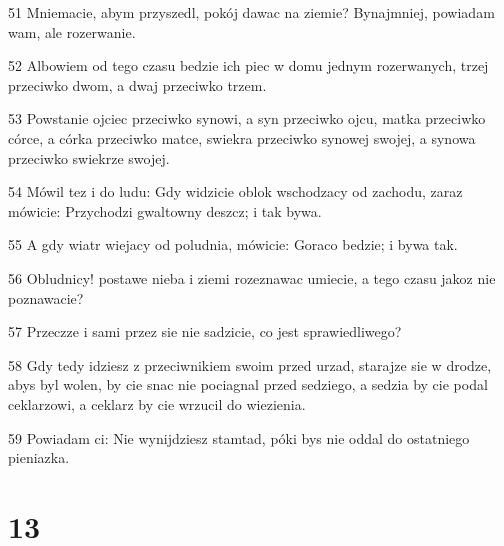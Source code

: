 \par 51 Mniemacie, abym przyszedl, pokój dawac na ziemie? Bynajmniej, powiadam wam, ale rozerwanie.
\par 52 Albowiem od tego czasu bedzie ich piec w domu jednym rozerwanych, trzej przeciwko dwom, a dwaj przeciwko trzem.
\par 53 Powstanie ojciec przeciwko synowi, a syn przeciwko ojcu, matka przeciwko córce, a córka przeciwko matce, swiekra przeciwko synowej swojej, a synowa przeciwko swiekrze swojej.
\par 54 Mówil tez i do ludu: Gdy widzicie oblok wschodzacy od zachodu, zaraz mówicie: Przychodzi gwaltowny deszcz; i tak bywa.
\par 55 A gdy wiatr wiejacy od poludnia, mówicie: Goraco bedzie; i bywa tak.
\par 56 Obludnicy! postawe nieba i ziemi rozeznawac umiecie, a tego czasu jakoz nie poznawacie?
\par 57 Przeczze i sami przez sie nie sadzicie, co jest sprawiedliwego?
\par 58 Gdy tedy idziesz z przeciwnikiem swoim przed urzad, starajze sie w drodze, abys byl wolen, by cie snac nie pociagnal przed sedziego, a sedzia by cie podal ceklarzowi, a ceklarz by cie wrzucil do wiezienia.
\par 59 Powiadam ci: Nie wynijdziesz stamtad, póki bys nie oddal do ostatniego pieniazka.

\chapter{13}

